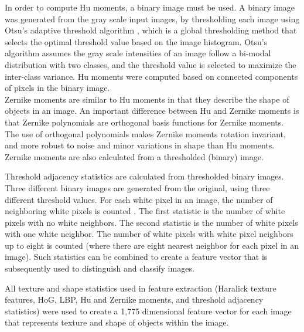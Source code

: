 In order to compute Hu moments, a binary image must be used.  A binary image was generated from the gray scale input images, by thresholding each image using Otsu's adaptive threshold algorithm \cite{Otsu1975}, which is a global thresholding method that selects the optimal threshold value based on the image histogram. Otsu's algorithm assumes the gray scale intensities of an image follow a bi-modal distribution with two classes, and the threshold value is selected to maximize the inter-class variance. Hu moments were computed based on connected components of pixels in the binary image.   \\

Zernike moments \cite{Khotanzad1990} are similar to Hu moments in that they describe the shape of objects in an image.  An important difference between Hu and Zernike moments is that Zernike polynomials are orthogonal basis functions for Zernike moments.  The use of orthogonal polynomials makes Zernike moments rotation invariant, and more robust to noise and minor variations in shape than Hu moments. Zernike moments are also calculated from a thresholded (binary) image.

Threshold adjacency statistics \cite{Lievers2004} are calculated from thresholded binary images. Three different binary images are generated from the original, using three different threshold values.  For each white pixel in an image, the number of neighboring white pixels is counted \cite{Klinger2012}.  The first statistic is the number of white pixels with no white neighbors.  The second statistic is the number of white pixels with one white neighbor.  The number of white pixels with white pixel neighbors up to eight is counted (where there are eight nearest neighbor for each pixel in an image).  Such statistics can be combined to create a feature vector that is subsequently used to distinguish and classify images.   

All texture and shape statistics used in feature extraction (Haralick texture features, HoG, LBP, Hu and Zernike moments, and threshold adjacency statistics) were used to create a 1,775 dimensional feature vector for each image that represents texture and shape of objects within the image. 

